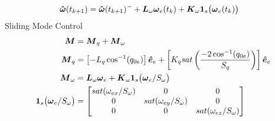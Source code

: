 \begin{nomenclature}
\begin{subequations}
\begin{align}
    \boldsymbol{\hat{\omega}}(t_{k+1}) &= \boldsymbol{\hat{\omega}}(t_{k+1})^- + \boldsymbol{L}_{\omega} \boldsymbol{\omega}_e(t_{k}) + \boldsymbol{K}_{\omega}\boldsymbol{1}_s \big(\boldsymbol{\omega}_e(t_{k}) \big)
  \end{align}
\end{subequations}
Sliding Mode Control
\begin{equation}
  \begin{aligned}
    \boldsymbol{M} &= \boldsymbol{M}_{q} + \boldsymbol{M}_{\omega} \\
    \boldsymbol{M}_{q} &= \left[- L_{q} \cos^{-1} (q_{0e}) \right] \boldsymbol{\hat{e}}_e + \left[ K_{q} sat \left( \frac{-2\cos^{-1} (q_{0e})}{S_q} \right) \right] \boldsymbol{\hat{e}}_e \\
    \boldsymbol{M}_{\omega} &= \boldsymbol{L}_{\omega} \boldsymbol{\omega}_e + \boldsymbol{K}_{\omega}\boldsymbol{1}_s \big(\boldsymbol{\omega}_e / S_{\omega} \big) \\
    \boldsymbol{1}_s \big(\boldsymbol{\omega}_e / S_{\omega} \big) &= \begin{bmatrix} sat (\omega_{ex} / S_{\omega}) &0 &0 \\ 0 & sat (\omega_{ey} / S_{\omega}) & 0 \\ 0 & 0 & sat (\omega_{ez} / S_{\omega}) \end{bmatrix}
  \end{aligned}
\end{equation}


\end{nomenclature}

